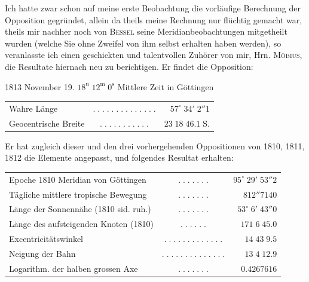 \par\indent Ich hatte zwar schon auf meine erste Beobachtung die vorläufige Berechnung der Opposition gegründet, allein da theils meine Rechnung nur flüchtig gemacht war, theils mir nachher noch von \textsc{Bessel} seine Meridianbeobachtungen mitgetheilt wurden (welche Sie ohne Zweifel von ihm selbst erhalten haben werden), so veranlasste ich einen geschickten und talentvollen Zuhörer von mir, Hrn. \textsc{Möbius}, die Resultate hiernach neu zu berichtigen. Er findet die Opposition:

\begin{center}1813 November 19. $18^{\mathrm u}\;12^{\mathrm m}\;0^{\mathrm s}$ Mittlere Zeit in Göttingen\end{center}
\begin{center}\fontsize{10}{12}\selectfont\setlength{\tabcolsep}{2pt}\renewcommand{\arraystretch}{1.15}\begin{tabular}{lcr}
Wahre Länge & $.\;.\;.\;.\;.\;.\;.\;.\;.\;.\;.\;.\;.\;.$ & $57^\circ\;34'\;2''1$\\
Geocentrische Breite & $.\;.\;.\;.\;.\;.\;.\;.\;.\;.\;.$ & $23\;18\;46.1\;\mathrm{S.}$\\
\end{tabular}\end{center}

\par\indent Er hat zugleich dieser und den drei vorhergehenden Oppositionen von 1810, 1811, 1812 die Elemente angepasst, und folgendes Resultat erhalten:

\begin{center}\fontsize{9}{11}\selectfont\setlength{\tabcolsep}{2pt}\renewcommand{\arraystretch}{1.15}\begin{tabular}{lcr}
Epoche 1810 Meridian von Göttingen & $.\;.\;.\;.\;.\;.\;.$ & $95^\circ\;29'\;53''2$\\
Tägliche mittlere tropische Bewegung & $.\;.\;.\;.\;.\;.\;.$ & $812''7140$\\
Länge der Sonnennähe (1810 sid. ruh.) & $.\;.\;.\;.\;.\;.\;.$ & $53^\circ\;6'\;43''0$\\
Länge des aufsteigenden Knoten (1810) & $.\;.\;.\;.\;.\;.$ & $171\;6\;45.0$\\
Excentricitätswinkel & $.\;.\;.\;.\;.\;.\;.\;.\;.\;.\;.\;.\;.$ & $14\;43\;9.5$\\
Neigung der Bahn & $.\;.\;.\;.\;.\;.\;.\;.\;.\;.\;.\;.\;.\;.$ & $13\;4\;12.9$\\
Logarithm. der halben grossen Axe & $.\;.\;.\;.\;.\;.\;.$ & $0.4267616$\\
\end{tabular}\end{center}

